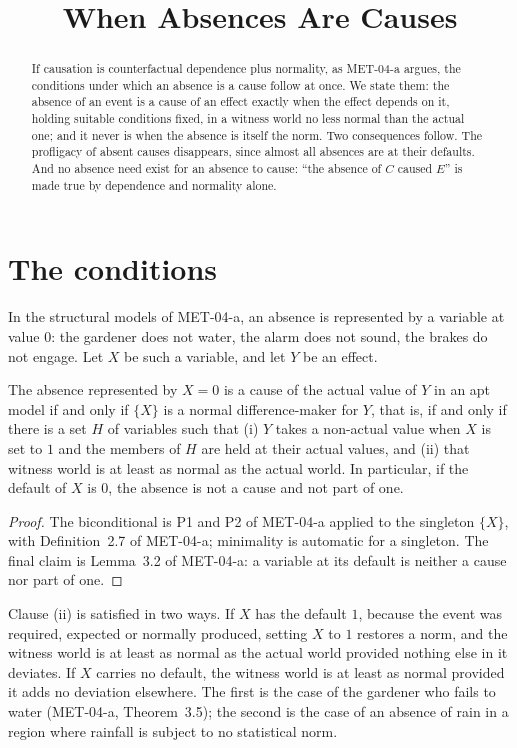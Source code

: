 \documentclass{situationist-preprint}
\title{When Absences Are Causes}
\begin{document}
\maketitle

\begin{abstract}
If causation is counterfactual dependence plus normality, as MET-04-a argues, the conditions under which an absence is a cause follow at once. We state them: the absence of an event is a cause of an effect exactly when the effect depends on it, holding suitable conditions fixed, in a witness world no less normal than the actual one; and it never is when the absence is itself the norm. Two consequences follow. The profligacy of absent causes disappears, since almost all absences are at their defaults. And no absence need exist for an absence to cause: \enquote{the absence of $C$ caused $E$} is made true by dependence and normality alone.
\end{abstract}

\section{The conditions}

In the structural models of MET-04-a, an absence is represented by a variable at value $0$: the gardener does not water, the alarm does not sound, the brakes do not engage. Let $X$ be such a variable, and let $Y$ be an effect.

\begin{proposition}\label{p:absence}
The absence represented by $X = 0$ is a cause of the actual value of $Y$ in an apt model if and only if $\{X\}$ is a normal difference-maker for $Y$, that is, if and only if there is a set $H$ of variables such that (i) $Y$ takes a non-actual value when $X$ is set to $1$ and the members of $H$ are held at their actual values, and (ii) that witness world is at least as normal as the actual world. In particular, if the default of $X$ is $0$, the absence is not a cause and not part of one.
\end{proposition}

\begin{proof}
The biconditional is P1 and P2 of MET-04-a applied to the singleton $\{X\}$, with Definition~2.7 of MET-04-a; minimality is automatic for a singleton. The final claim is Lemma~3.2 of MET-04-a: a variable at its default is neither a cause nor part of one.
\end{proof}

Clause (ii) is satisfied in two ways. If $X$ has the default $1$, because the event was required, expected or normally produced, setting $X$ to $1$ restores a norm, and the witness world is at least as normal as the actual world provided nothing else in it deviates. If $X$ carries no default, the witness world is at least as normal provided it adds no deviation elsewhere. The first is the case of the gardener who fails to water (MET-04-a, Theorem~3.5); the second is the case of an absence of rain in a region where rainfall is subject to no statistical norm.
\end{document}
